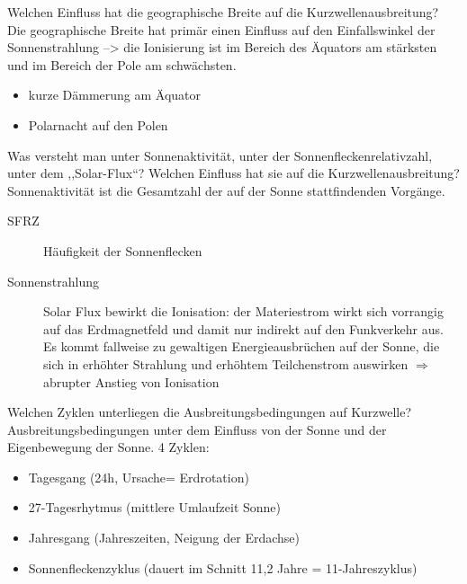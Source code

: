 \documentclass[avery5371,grid,frame,a4paper]{flashcards}
\newcommand{\card}[3]{
  \begin{flashcard}[{\chap} -- #1]{#2}#3\end{flashcard}
}
\begin{document}
\card{23}{Welchen Einfluss hat die geographische Breite auf die Kurzwellenausbreitung?}{
  Die geographische Breite hat primär einen Einfluss auf den Einfallswinkel der Sonnenstrahlung --> die Ionisierung ist im Bereich des Äquators am stärksten und im Bereich der Pole am schwächsten.
  \begin{itemize}
    \item kurze Dämmerung am Äquator
    \item Polarnacht auf den Polen
  \end{itemize}
}
\card{24}{Was versteht man unter Sonnenaktivität, unter der Sonnenfleckenrelativzahl, unter dem ,,Solar-Flux``? Welchen Einfluss hat sie auf die Kurzwellenausbreitung?}{
  \small
  Sonnenaktivität ist die Gesamtzahl der auf der Sonne stattfindenden Vorgänge.
  \begin{description}
    \item[SFRZ] Häufigkeit der Sonnenflecken
    \item[Sonnenstrahlung] Solar Flux bewirkt die Ionisation: der Materiestrom wirkt sich vorrangig auf das Erdmagnetfeld und damit nur indirekt auf den Funkverkehr aus. Es kommt fallweise zu gewaltigen Energieausbrüchen auf der Sonne, die sich in erhöhter Strahlung und erhöhtem Teilchenstrom auswirken $\Rightarrow$ abrupter Anstieg von Ionisation
  \end{description}
}
\card{25}{Welchen Zyklen unterliegen die Ausbreitungsbedingungen auf Kurzwelle?}{
  Ausbreitungsbedingungen unter dem Einfluss von der Sonne und der Eigenbewegung der Sonne.
  4 Zyklen:
  \begin{itemize}
    \item Tagesgang (24h, Ursache= Erdrotation)
    \item 27-Tagesrhytmus (mittlere Umlaufzeit Sonne)
    \item Jahresgang (Jahreszeiten, Neigung der Erdachse)
    \item Sonnenfleckenzyklus (dauert im Schnitt 11,2 Jahre = 11-Jahreszyklus)
  \end{itemize}
}
\end{document}
